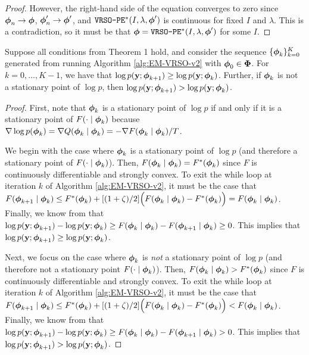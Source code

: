 \begin{proof}
    However, the right-hand side of the equation converges to zero since $\boldsymbol{\phi}_n \to \boldsymbol{\phi}$, $\boldsymbol{\phi}'_n \to \boldsymbol{\phi}'$, and $\texttt{VRSO-PE}^*(I,\lambda,\boldsymbol{\phi}')$ is continuous for fixed $I$ and $\lambda$. This is a contradiction, so it must be that $\boldsymbol{\phi} = \texttt{VRSO-PE}^*(I,\lambda,\boldsymbol{\phi}')$ for some $I$.
\end{proof}

\begin{lemma}
    Suppose all conditions from Theorem 1 hold, and consider the sequence $\{\boldsymbol{\phi}_k\}_{k=0}^{K}$ generated from running Algorithm \ref{alg:EM-VRSO-v2} with $\boldsymbol{\phi}_0 \in \boldsymbol{\Phi}$. For $k = 0,\ldots,K-1$, we have that $\log p(\mathbf{y};\boldsymbol{\phi}_{k+1}) \geq \log p(\mathbf{y};\boldsymbol{\phi}_k)$. Further, if $\boldsymbol{\phi}_k$ is not a stationary point of $\log p$, then $\log p(\mathbf{y};\boldsymbol{\phi}_{k+1}) > \log p(\mathbf{y};\boldsymbol{\phi}_k)$.
\end{lemma}

\begin{proof}

First, note that $\boldsymbol{\phi}_k$ is a stationary point of $\log p$ if and only if it is a stationary point of $F(\cdot \mid \boldsymbol{\phi}_k)$ because $\nabla \log p(\boldsymbol{\phi}_k) = \nabla Q(\boldsymbol{\phi}_k \mid \boldsymbol{\phi}_k) = -\nabla F(\boldsymbol{\phi}_k \mid \boldsymbol{\phi}_k) / T$.

We begin with the case where $\boldsymbol{\phi}_k$ is a stationary point of $\log p$ (and therefore a stationary point of $F(\cdot \mid \boldsymbol{\phi}_k)$). Then, $F(\boldsymbol{\phi}_k \mid \boldsymbol{\phi}_k) = F^{*}(\boldsymbol{\phi}_{k})$ since $F$ is continuously differentiable and strongly convex. To exit the while loop at iteration $k$ of Algorithm \ref{alg:EM-VRSO-v2}, it must be the case that $F(\boldsymbol{\phi}_{k+1} \mid \boldsymbol{\phi}_{k}) \leq F^*(\boldsymbol{\phi}_{k}) + [(1+\zeta)/2] \Big(F(\boldsymbol{\phi}_{k} \mid \boldsymbol{\phi}_{k}) - F^*(\boldsymbol{\phi}_{k}) \Big) = F(\boldsymbol{\phi}_k \mid \boldsymbol{\phi}_k)$. Finally, we know from \citet{Dempster:1977} that $\log p(\mathbf{y} ; \boldsymbol{\phi}_{k+1}) - \log p(\mathbf{y} ; \boldsymbol{\phi}_{k}) \geq F(\boldsymbol{\phi}_{k} \mid \boldsymbol{\phi}_{k}) - F(\boldsymbol{\phi}_{k+1} \mid \boldsymbol{\phi}_{k}) \geq 0$. This implies that $\log p(\mathbf{y} ; \boldsymbol{\phi}_{k+1}) \geq \log p(\mathbf{y} ; \boldsymbol{\phi}_{k})$.

Next, we focus on the case where $\boldsymbol{\phi}_k$ is \textit{not} a stationary point of $\log p$ (and therefore not a stationary point $F(\cdot \mid \boldsymbol{\phi}_k)$). Then, $F(\boldsymbol{\phi}_k \mid \boldsymbol{\phi}_k) > F^{*}(\boldsymbol{\phi}_{k})$ since $F$ is continuously differentiable and strongly convex. To exit the while loop at iteration $k$ of Algorithm \ref{alg:EM-VRSO-v2}, it must be the case that $F(\boldsymbol{\phi}_{k+1} \mid \boldsymbol{\phi}_{k}) \leq F^*(\boldsymbol{\phi}_{k}) + [(1+\zeta)/2] \Big(F(\boldsymbol{\phi}_{k} \mid \boldsymbol{\phi}_{k}) - F^*(\boldsymbol{\phi}_{k}) \Big) < F(\boldsymbol{\phi}_k \mid \boldsymbol{\phi}_k)$. Finally, we know from \citet{Dempster:1977} that $\log p(\mathbf{y} ; \boldsymbol{\phi}_{k+1}) - \log p(\mathbf{y} ; \boldsymbol{\phi}_{k}) \geq F(\boldsymbol{\phi}_{k} \mid \boldsymbol{\phi}_{k}) - F(\boldsymbol{\phi}_{k+1} \mid \boldsymbol{\phi}_{k}) > 0$. This implies that $\log p(\mathbf{y} ; \boldsymbol{\phi}_{k+1}) > \log p(\mathbf{y} ; \boldsymbol{\phi}_{k})$.
\end{proof}

